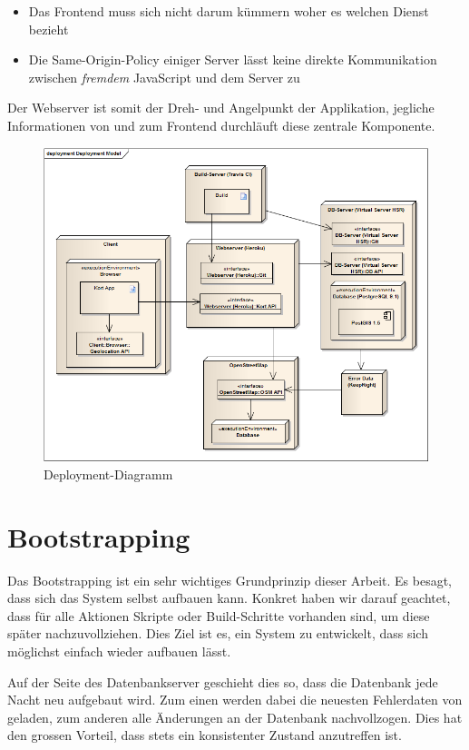 \begin{itemize}
\item Das Frontend muss sich nicht darum kümmern woher es welchen Dienst bezieht
\item Die Same-Origin-Policy\cite{sop} einiger Server lässt keine direkte Kommunikation zwischen \emph{fremdem} JavaScript und dem Server zu
\end{itemize}

Der Webserver ist somit der Dreh- und Angelpunkt der Applikation, jegliche Informationen von und zum Frontend durchläuft diese zentrale Komponente.

\begin{figure}[H]
	\centering
	\includegraphics[width=\textwidth]{images/uml/deployment_diagram}
	\caption{Deployment-Diagramm}
	\label{deplyoyment-diagram}
\end{figure}

\section{Bootstrapping}
Das \gls{Bootstrapping} ist ein sehr wichtiges Grundprinzip dieser Arbeit.
Es besagt, dass sich das System selbst aufbauen kann.
Konkret haben wir darauf geachtet, dass für alle Aktionen Skripte oder Build-Schritte vorhanden sind, um diese später nachzuvollziehen.
Dies Ziel ist es, ein System zu entwickelt, dass sich möglichst einfach wieder aufbauen lässt.

Auf der Seite des Datenbankserver geschieht dies so, dass die Datenbank jede Nacht neu aufgebaut wird.
Zum einen werden dabei die neuesten Fehlerdaten von  geladen, zum anderen alle Änderungen an der Datenbank nachvollzogen.
Dies hat den grossen Vorteil, dass stets ein konsistenter Zustand anzutreffen ist.

